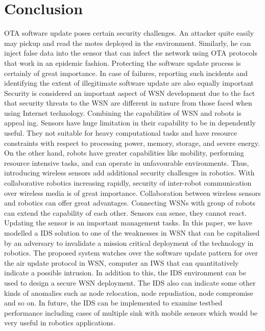\documentclass[conference,manuscript]{IEEEtran}
\begin{document}
\section{Conclusion}
\label{sec:co}

OTA software update poses certain security challenges. An
attacker quite easily may pickup and read the motes deployed
in the environment. Similarly, he can inject false data into
the sensor that can infect the network using OTA protocols
that work in an epidemic fashion. Protecting the software
update process is certainly of great importance. In case of
failures, reporting such incidents and identifying the extent of
illegitimate software update are also equally important Security
is considered an important aspect of WSN development due to
the fact that security threats to the WSN are different in nature
from those faced when using Internet technology.
Combining the capabilities of WSN and robots is appeal
ing. Sensors have huge limitation in their capability to be in
dependently useful. They not suitable for heavy computational
tasks and have resource constraints with respect to processing
power, memory, storage, and severe energy. On the other
hand, robots have greater capabilities like mobility, performing
resource intensive tasks, and can operate in unfavourable
environments.
Thus, introducing wireless sensors add additional security
challenges in robotics. With collaborative robotics increasing
rapidly, security of inter-robot communication over wireless
media is of great importance.
Collaboration between wireless sensors and robotics can
offer great advantages. Connecting WSNs with group of robots
can extend the capability of each other. Sensors can sense, they
cannot react. Updating the sensor is an important management
tasks. In this paper, we have modelled a IDS solution to
one of the weaknesses in WSN that can be capitalised by
an adversary to invalidate a mission critical deployment of
the technology in robotics. The proposed system watches over
the software update pattern for over the air update protocol
in WSN, computer an IWS that can quantitatively indicate a
possible intrusion. In addition to this, the IDS environment
can be used to design a secure WSN deployment. The IDS
also can indicate some other kinds of anomalies such as node
relocation, node repudiation, node compromise and so on.
In future, the IDS can be implemented to examine testbed
performance including cases of multiple sink with mobile
sensors which would be very useful in robotics applications.






\end{document}

